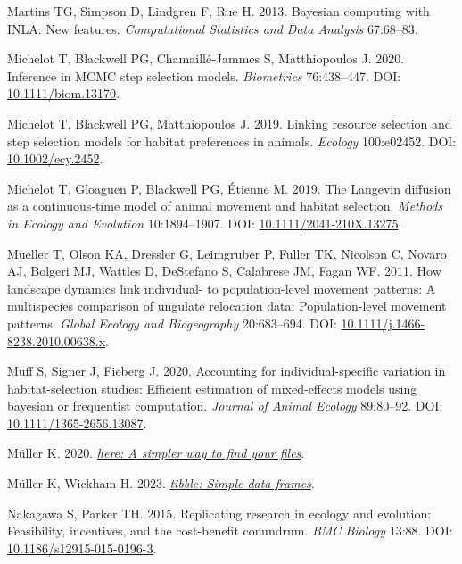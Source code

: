 \documentclass[10pt,a4paper]{article}
\newlength{\cslhangindent}
\newenvironment{CSLReferences}[2] %
 {\begin{list}{}{%
  \setlength{\itemindent}{0pt}
  \setlength{\leftmargin}{0pt}
  \setlength{\parsep}{0pt}
  \ifodd #1
   \setlength{\leftmargin}{\cslhangindent}
   \setlength{\itemindent}{-1\cslhangindent}
  \fi
  \setlength{\itemsep}{#2\baselineskip}}}
 {\end{list}}
\begin{document}
\begin{CSLReferences}{1}{0}
Martins TG, Simpson D, Lindgren F, Rue H. 2013. Bayesian computing with {INLA}: {N}ew features. \emph{Computational Statistics and Data Analysis} 67:68--83.

Michelot T, Blackwell PG, Chamaillé‐Jammes S, Matthiopoulos J. 2020. Inference in {MCMC} step selection models. \emph{Biometrics} 76:438--447. DOI: \href{https://doi.org/10.1111/biom.13170}{10.1111/biom.13170}.

Michelot T, Blackwell PG, Matthiopoulos J. 2019. Linking resource selection and step selection models for habitat preferences in animals. \emph{Ecology} 100:e02452. DOI: \href{https://doi.org/10.1002/ecy.2452}{10.1002/ecy.2452}.

Michelot T, Gloaguen P, Blackwell PG, Étienne M. 2019. The {Langevin} diffusion as a continuous‐time model of animal movement and habitat selection. \emph{Methods in Ecology and Evolution} 10:1894--1907. DOI: \href{https://doi.org/10.1111/2041-210X.13275}{10.1111/2041-210X.13275}.

Mueller T, Olson KA, Dressler G, Leimgruber P, Fuller TK, Nicolson C, Novaro AJ, Bolgeri MJ, Wattles D, DeStefano S, Calabrese JM, Fagan WF. 2011. How landscape dynamics link individual- to population-level movement patterns: A multispecies comparison of ungulate relocation data: {Population}-level movement patterns. \emph{Global Ecology and Biogeography} 20:683--694. DOI: \href{https://doi.org/10.1111/j.1466-8238.2010.00638.x}{10.1111/j.1466-8238.2010.00638.x}.

Muff S, Signer J, Fieberg J. 2020. Accounting for individual-specific variation in habitat-selection studies: Efficient estimation of mixed-effects models using bayesian or frequentist computation. \emph{Journal of Animal Ecology} 89:80--92. DOI: \href{https://doi.org/10.1111/1365-2656.13087}{10.1111/1365-2656.13087}.

Müller K. 2020. \emph{\href{https://CRAN.R-project.org/package=here}{{here}: A simpler way to find your files}}.

Müller K, Wickham H. 2023. \emph{\href{https://CRAN.R-project.org/package=tibble}{{tibble}: Simple data frames}}.

Nakagawa S, Parker TH. 2015. Replicating research in ecology and evolution: Feasibility, incentives, and the cost-benefit conundrum. \emph{BMC Biology} 13:88. DOI: \href{https://doi.org/10.1186/s12915-015-0196-3}{10.1186/s12915-015-0196-3}.


\end{CSLReferences}
\end{document}
